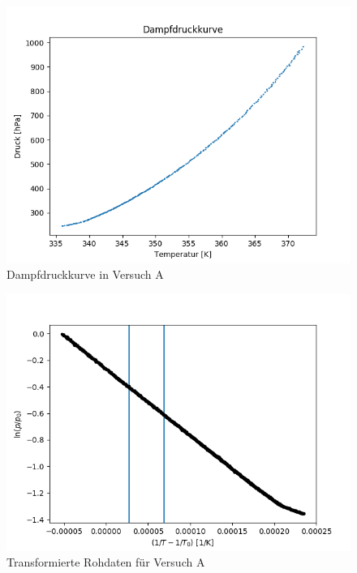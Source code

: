\documentclass[12pt,a4paper]{article}
\begin{document}
\begin{figure}
\includegraphics[width=\linewidth]{Bilder/DampfdruckkurveA.png}
\caption[Dampfdruckkurve A]{Dampfdruckkurve in Versuch A}
\label{fig:DampfA}
\end{figure}

\begin{figure}
\includegraphics[width=\linewidth]{Bilder/log_RohdatenA.png}
\caption[Transformierte Daten A]{Transformierte Rohdaten für Versuch A}
\label{fig:logA}
\end{figure}
\end{document}
